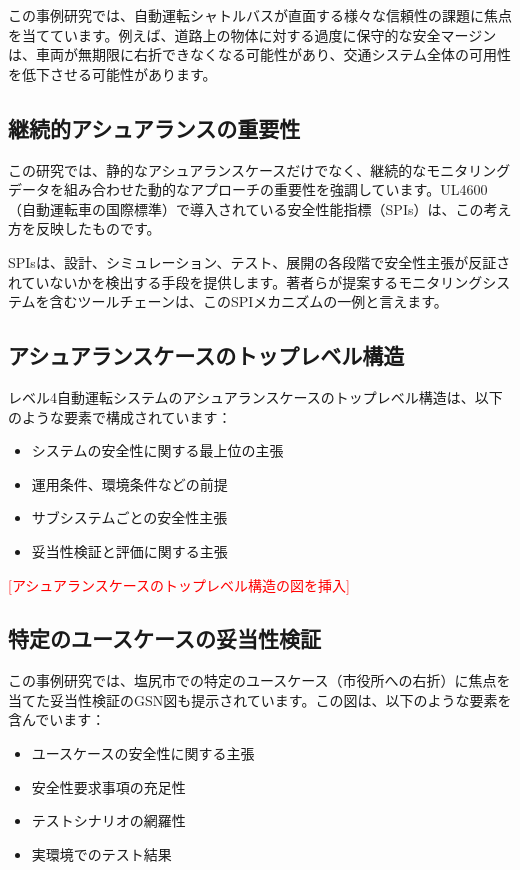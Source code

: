 この事例研究では、自動運転シャトルバスが直面する様々な信頼性の課題に焦点を当てています。例えば、道路上の物体に対する過度に保守的な安全マージンは、車両が無期限に右折できなくなる可能性があり、交通システム全体の可用性を低下させる可能性があります。

\subsection{継続的アシュアランスの重要性}

この研究では、静的なアシュアランスケースだけでなく、継続的なモニタリングデータを組み合わせた動的なアプローチの重要性を強調しています。UL4600（自動運転車の国際標準）で導入されている安全性能指標（SPIs）は、この考え方を反映したものです。

SPIsは、設計、シミュレーション、テスト、展開の各段階で安全性主張が反証されていないかを検出する手段を提供します。著者らが提案するモニタリングシステムを含むツールチェーンは、このSPIメカニズムの一例と言えます。

\subsection{アシュアランスケースのトップレベル構造}

レベル4自動運転システムのアシュアランスケースのトップレベル構造は、以下のような要素で構成されています：

\begin{itemize}
    \item システムの安全性に関する最上位の主張
    \item 運用条件、環境条件などの前提
    \item サブシステムごとの安全性主張
    \item 妥当性検証と評価に関する主張
\end{itemize}

\textcolor{red}{[アシュアランスケースのトップレベル構造の図を挿入]}

\subsection{特定のユースケースの妥当性検証}

この事例研究では、塩尻市での特定のユースケース（市役所への右折）に焦点を当てた妥当性検証のGSN図も提示されています。この図は、以下のような要素を含んでいます：

\begin{itemize}
    \item ユースケースの安全性に関する主張
    \item 安全性要求事項の充足性
    \item テストシナリオの網羅性
    \item 実環境でのテスト結果
\end{itemize}

